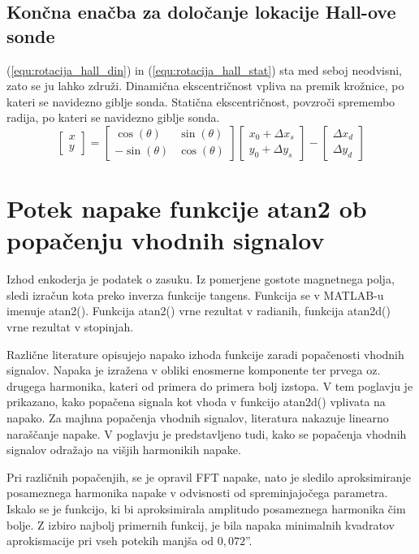 \section{Končna enačba za določanje lokacije Hall-ove sonde}
(\ref{equ:rotacija_hall_din}) in (\ref{equ:rotacija_hall_stat}) sta med seboj neodvisni, zato se ju lahko združi. 
Dinamična ekscentričnost vpliva na premik krožnice, po kateri se navidezno giblje sonda. Statična ekscentričnost, povzroči spremembo radija, po kateri se navidezno giblje sonda.
\begin{equation}
\label{equ:rotacija_hall_koncna}
\begin{bmatrix} x\\y \end{bmatrix}=
\begin{bmatrix} \cos(\theta)&\sin(\theta)\\-\sin(\theta)&\cos(\theta) \end{bmatrix}
\begin{bmatrix} x_0+\Delta x_s\\y_0+\Delta y_s \end{bmatrix}-
\begin{bmatrix} \Delta x_d\\\Delta y_d \end{bmatrix}
\end{equation}
%
%
\chapter{Potek napake funkcije atan2 ob popačenju vhodnih signalov}
Izhod enkoderja je podatek o zasuku. Iz pomerjene gostote magnetnega polja, sledi izračun kota preko inverza funkcije tangens. Funkcija se v MATLAB-u imenuje atan2(). Funkcija atan2() vrne rezultat v radianih,
funkcija atan2d() vrne rezultat v stopinjah\cite{atan2Matlab}\cite{atan2dMatlab}.

Različne literature \cite{RLS3} \cite{osnova} \cite{RLS1} \cite{RLS2} opisujejo napako izhoda funkcije zaradi popačenosti vhodnih signalov. Napaka je izražena v obliki enosmerne komponente ter prvega oz. drugega
harmonika, kateri od primera do primera bolj izstopa. V tem poglavju je prikazano, kako popačena signala kot vhoda v funkcijo atan2d() vplivata na napako. Za majhna popačenja vhodnih signalov, literatura nakazuje linearno naraščanje napake. V poglavju je predstavljeno tudi, kako se popačenja vhodnih signalov odražajo na višjih harmonikih napake.

Pri različnih popačenjih, se je opravil FFT napake, nato je sledilo aproksimiranje posameznega harmonika napake v odvisnosti od spreminjajočega parametra. Iskalo se je funkcijo, ki bi aproksimirala amplitudo posameznega harmonika čim bolje. Z izbiro najbolj primernih funkcij, je bila napaka minimalnih kvadratov aprokismacije pri vseh potekih manjša od $0,072$''.

